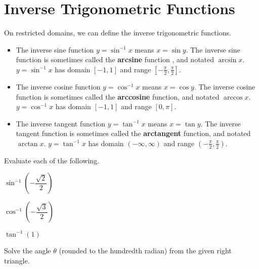 \newpage
\section{Inverse Trigonometric Functions}

\begin{definition}
  On restricted domains, we can define the inverse trigonometric functions.
  \begin{itemize}
    \item The inverse sine function $y={\sin}^{-1}x$ means $x=\sin y$. The inverse sine function is sometimes called the \textbf{arcsine} function , and notated $\arcsin x$. $y={\sin}^{-1}x$ has domain $[-1,1]$ and range $\left[-\frac{\pi}{2},\frac{\pi}{2}\right]$.
  
    \item The inverse cosine function $y={\cos}^{-1}x$ means $x=\cos y$. The inverse cosine function is sometimes called the \textbf{arccosine} function, and notated $\arccos x$. $y={\cos}^{-1}x$ has domain $[-1,1]$ and range $[0,\pi]$.
  
    \item The inverse tangent function $y={\tan}^{-1}x$ means $x=\tan y$. The inverse tangent function is sometimes called the \textbf{arctangent} function, and notated $\arctan x$. $y={\tan}^{-1}x$ has domain $(-\infty,\infty)$ and range $\left(-\frac{\pi}{2},\frac{\pi}{2}\right)$.
  \end{itemize}
\end{definition}

\begin{example}
Evaluate each of the following.\\
\begin{enumerate*}
    \item ${\sin}^{-1}\left(-\dfrac{\sqrt{2}}{2}\right)$
    \item ${\cos}^{-1}\left(-\dfrac{\sqrt{3}}{2}\right)$
    \item ${\tan}^{-1}(1)$\hfill\null
\end{enumerate*}
\end{example}

\newpage

\begin{example}
  Solve the angle $\theta$ (rounded to the hundredth radian) from the given right triangle.

\end{example}


